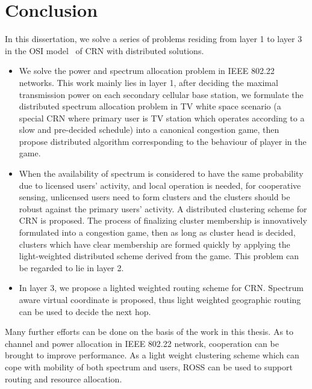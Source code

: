 \chapter{Conclusion}
In this dissertation, we solve a series of problems residing from layer 1 to layer 3 in the OSI model~\cite{osi} of CRN with distributed solutions.
\begin{itemize}
\item We solve the power and spectrum allocation problem in IEEE 802.22 networks.
This work mainly lies in layer 1, after deciding the maximal transmission power on each secondary cellular base station, we formulate the distributed spectrum allocation problem in TV white space scenario (a special CRN where primary user is TV station which operates according to a slow and pre-decided schedule) into a canonical congestion game, then propose distributed algorithm corresponding to the behaviour of player in the game.

\item 
When the availability of spectrum is considered to have the same probability due to licensed users' activity, and local operation is needed, \ie for cooperative sensing, unlicensed users need to form clusters and the clusters should be robust against the primary users' activity.
A distributed clustering scheme for CRN is proposed. 
The process of finalizing cluster membership is innovatively formulated into a congestion game, then as long as cluster head is decided, clusters which have clear membership are formed quickly by applying the  light-weighted distributed scheme derived from the game.
This problem can be regarded to lie in layer 2.

\item In layer 3, we propose a lighted weighted routing scheme for CRN. 
Spectrum aware virtual coordinate is proposed, thus light weighted geographic routing can be used to decide the next hop.
\end{itemize}

Many further efforts can be done on the basis of the work in this thesis.
As to channel and power allocation in IEEE 802.22 network, cooperation can be brought to improve performance. 
As a light weight clustering scheme which can cope with mobility of both spectrum and users, ROSS can be used to support routing and resource allocation.


